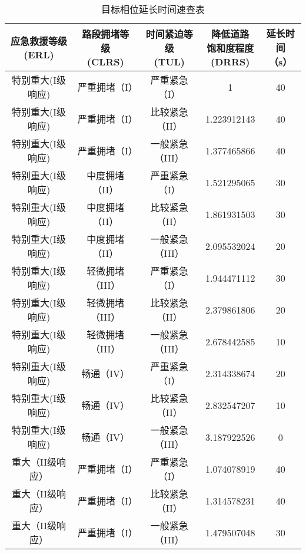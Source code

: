 \begin{center}
	\begin{longtable}{|c|c|c|c|c|}
		\caption{目标相位延长时间速查表} 
		\label{table:fulu_extendtime} \\
		\hline
		\tabincell{c}{应急救援等级\\(ERL)} & \tabincell{c}{路段拥堵等级\\(CLRS)}	& \tabincell{c}{时间紧迫等级\\(TUL)} & \tabincell{c}{降低道路\\饱和度程度\\(DRRS)} & \tabincell{c}{延长时间\\（s） }\\ \hline
		特别重大(I级响应) & 严重拥堵（I）&    严重紧急（I）      &      1			 & 40         \\  \hline
		特别重大(I级响应) & 严重拥堵（I）&	 比较紧急（II）	      &  1.223912143	 & 40  \\ \hline
		特别重大(I级响应) & 严重拥堵（I）&	 一般紧急（III）      &  	1.377465866	 & 40 \\ \hline
		特别重大(I级响应) & 中度拥堵（II）&	 严重紧急（I）	      &  1.521295065	 & 30 \\ \hline
		特别重大(I级响应) & 中度拥堵（II）&	 比较紧急（II）      &  	1.861931503	 & 30 \\ \hline
		特别重大(I级响应) & 中度拥堵（II）&	 一般紧急（III）      &  	2.095532024	 & 20 \\  \hline
		特别重大(I级响应) & 轻微拥堵（III）&	 严重紧急（I）      &  	1.944471112	 & 30 \\  \hline
		特别重大(I级响应) & 轻微拥堵（III）&	 比较紧急（II）      &  	2.379861806	 & 20 \\ \hline
		特别重大(I级响应) & 轻微拥堵（III）&	 一般紧急（III）      &  	2.678442585	 & 10 \\ \hline
		特别重大(I级响应) & 畅通（IV）	&      严重紧急（I）      &  2.314338674 &  20 \\ \hline
		特别重大(I级响应) & 畅通（IV）	& 	   比较紧急（II）      &  	  2.832547207 &  10 \\ \hline
		特别重大(I级响应) & 畅通（IV）	&      一般紧急（III）      &    3.187922526 &  0 \\ \hline
		重大（II级响应）&   严重拥堵（I）&	 严重紧急（I）      &  1.074078919	 & 40 \\ \hline
		重大（II级响应）&   严重拥堵（I）&	 比较紧急（II）	      &  1.314578231	 & 40 \\ \hline
		重大（II级响应）&   严重拥堵（I）&	 一般紧急（III）      &  	1.479507048	 & 30 \\ \hline

\end{longtable}
\end{center}

